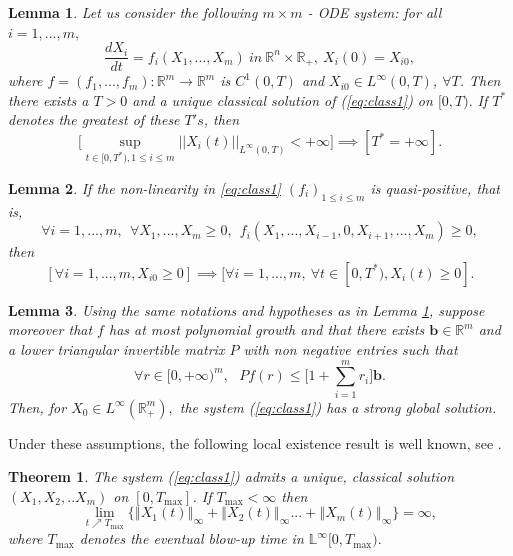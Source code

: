 \documentclass[sn-mathphys-num]{sn-jnl}
\numberwithin{equation}{section}
\numberwithin{equation}{section}
\newtheorem{Thm}{Theorem}
\newtheorem{Lem}{Lemma}
\begin{document}
\begin{Lem}
\label{lem:class1}
	Let us consider the following $m\times m$ - ODE system: for all $i=1,...,m,$ 
	\begin{equation}
		\label{eq:class1}
		\frac{ d X_i}{dt}=f_i(X_1,...,X_m)~in~ \mathbb{R}^{n} \times \mathbb{R}_+ , \ X_i(0)=X_{i0},
	\end{equation}
	where $f=(f_1,...,f_m):\mathbb{R}^m \rightarrow \mathbb{R}^m$ is $C^1(0,T)$ and $X_{i0}\in L^{\infty}(0,T)$, $\forall T$. Then there exists a $T>0$ and a unique classical solution of (\ref{eq:class1}) on $[0,T).$ If $T^*$ denotes the greatest of these $T's$, then 
	\begin{equation*}
		\Bigg[\sup_{t \in [0,T^*),1\leq i\leq m} ||X_i(t)||_{L^{\infty}(0,T)} < +\infty \Bigg] \implies [T^*=+\infty].
	\end{equation*}
 \end{Lem}

 \begin{Lem}
 \label{lem:qp}
	If the non-linearity in \eqref{eq:class1} $(f_i)_{1\leq i\leq m}$ is  quasi-positive, that is, 
	$$\forall i=1,..., m,~~\forall X_1,..., X_m \geq 0,~~f_i(X_1,...,X_{i-1}, 0, X_{i+1}, ..., X_m)\geq 0,$$
	then $$[\forall i=1,..., m, X_{i0}\geq 0]\implies [\forall i=1,...,m,~ \forall t\in [0,T^*), X_i(t)\geq 0].$$
\end{Lem}

\begin{Lem}\label{lem:class2}
	Using the same notations and hypotheses as in Lemma \ref{lem:class1}, suppose moreover that $f$ has at most polynomial growth and that there exists $\mathbf{b}\in \mathbb{R}^m$ and a lower triangular invertible matrix $P$ with non negative entries such that  $$\forall r \in [0,+\infty)^m,~~~Pf(r)\leq \Bigg[1+ \sum_{i=1}^{m} r_i \Bigg]\mathbf{b}.$$
	Then, for $X_0 \in L^{\infty}(\mathbb{R}_+^m),$ the system (\ref{eq:class1}) has a strong global solution.
\end{Lem}

Under these assumptions, the following local existence result is well known, see \cite{Hen84}.

\begin{Thm}
	\label{thm:class3}
	The system (\ref{eq:class1}) admits a unique, classical solution $(X_{1},X_{2},..X_{m})$ on $%
	[0,T_{\max }]$. If $T_{\max }<\infty $ then 
	\begin{equation}
		\underset{t\nearrow T_{\max }}{\lim }\Big\{ \left\Vert X_{1}(t)\right\Vert
		_{\infty }+\left\Vert X_{2}(t)\right\Vert _{\infty }...+ \left\Vert X_{m}(t)\right\Vert _{\infty }\Big\} =\infty ,  
	\end{equation}%
	where $T_{\max }$ denotes the eventual blow-up time in $\mathbb{L}^{\infty }[0,T_{\max }).$
\end{Thm}
\end{document}
